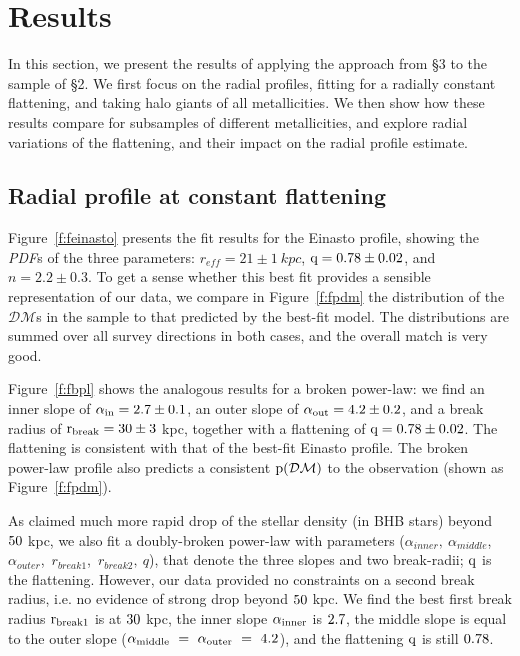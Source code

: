 \documentclass[12pt,preprint]{aastex}
\newcommand{\DM}{\mathcal{DM}}
\begin{document}
\section{Results}\label{sec:Results}
In this section, we present the results of applying the approach from \S 3 to the sample of \S 2. 
We first focus on the radial profiles, fitting for a radially constant flattening, and taking halo giants of all metallicities. We then show how these results compare for subsamples of different metallicities, and explore radial variations of the flattening, and their impact on the radial profile estimate. 

\subsection{Radial profile at constant flattening}\label{sec:Results_RadialProfile}

Figure~\ref{f:feinasto} presents the fit results for the Einasto profile,  showing the \textit{PDF}s of the three parameters: $r_{eff}=21\pm1~kpc$, $\rm q=0.78\pm0.02$, and $n=2.2\pm0.3$.
To get a sense whether this best fit provides a sensible representation of our data, we compare
 in Figure~\ref{f:fpdm} the distribution of the $\DM$s in the sample to that predicted by the best-fit model. The distributions are summed over all survey directions in both cases, and the overall match is very good. 

Figure~\ref{f:fbpl} shows the analogous results for a broken power-law: we find an inner slope of $\rm \alpha_{in}=2.7\pm0.1$, an outer slope of $\rm \alpha_{out}=4.2\pm0.2$, and a break radius of
 $\rm r_{break}=30\pm3~$kpc, together with a flattening of $\rm q=0.78\pm0.02$. The flattening is consistent with that of the best-fit Einasto profile. The broken power-law profile also predicts a consistent $\rm p(\DM)$ to the observation (shown as Figure~\ref{f:fpdm}).
 
As \citet{Deason2014} claimed much more rapid drop of the stellar density (in BHB stars) beyond $\rm 50~$kpc, we also fit a doubly-broken power-law with parameters  ($\alpha_{inner},~\alpha_{middle}$,~$\alpha_{outer}$,~$r_{break1}$,~$r_{break2},~q$), that denote the three slopes and two break-radii; $\rm q$ is the flattening. However, our data provided no constraints on a second break radius, i.e. no evidence of strong drop beyond $\rm 50~$kpc. We find the best first break radius $\rm r_{break1}$ is at $\rm 30~$kpc, the inner slope $\rm \alpha_{inner}$ is $\rm 2.7$, the middle slope is equal to the outer slope ($\rm \alpha_{middle}~=~ \alpha_{outer}~=~4.2$), and the flattening $\rm q$ is still $\rm 0.78$.
\end{document}
